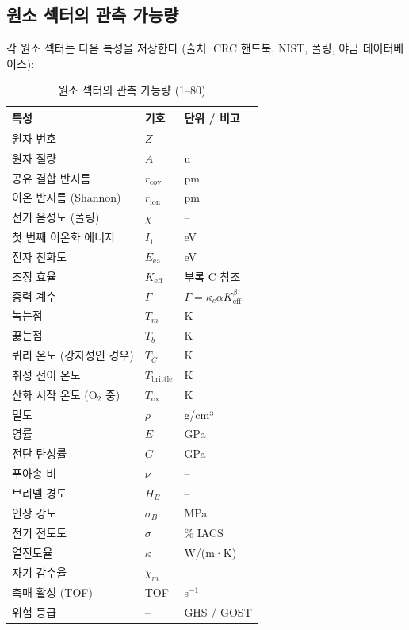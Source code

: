 \documentclass[12pt,a4paper]{article}
\newcommand{\Keff}{K_{\mathrm{eff}}}
\newcommand{\Gcoeff}{\Gamma}      %
\begin{document}
	\subsection{원소 섹터의 관측 가능량}
	
	각 원소 섹터는 다음 특성을 저장한다 (출처: CRC 핸드북, NIST, 폴링, 야금 데이터베이스):
	
	\begin{longtable}{p{4cm} p{3cm} p{8cm}}
		\caption{원소 섹터의 관측 가능량 (1–80)} \\
		\toprule
		\textbf{특성} & \textbf{기호} & \textbf{단위 / 비고} \\
		\midrule
		원자 번호 & \(Z\) & – \\
		원자 질량 & \(A\) & u \\
		공유 결합 반지름 & \(r_{\text{cov}}\) & pm \\
		이온 반지름 (Shannon) & \(r_{\text{ion}}\) & pm \\
		전기 음성도 (폴링) & \(\chi\) & – \\
		첫 번째 이온화 에너지 & \(I_1\) & eV \\
		전자 친화도 & \(E_{\text{ea}}\) & eV \\
		조정 효율 & \(\Keff\) & 부록 C 참조 \\
		중력 계수 & \(\Gcoeff\) & \(\Gcoeff = \kappa_c \alpha \Keff^{\beta}\) \\
		녹는점 & \(T_m\) & K \\
		끓는점 & \(T_b\) & K \\
		퀴리 온도 (강자성인 경우) & \(T_C\) & K \\
		취성 전이 온도 & \(T_{\text{brittle}}\) & K \\
		산화 시작 온도 (O\(_{2}\) 중) & \(T_{\text{ox}}\) & K \\
		밀도 & \(\rho\) & g/cm³ \\
		영률 & \(E\) & GPa \\
		전단 탄성률 & \(G\) & GPa \\
		푸아송 비 & \(\nu\) & – \\
		브리넬 경도 & \(H_B\) & – \\
		인장 강도 & \(\sigma_B\) & MPa \\
		전기 전도도 & \(\sigma\) & \% IACS \\
		열전도율 & \(\kappa\) & W/(m·K) \\
		자기 감수율 & \(\chi_m\) & – \\
		촉매 활성 (TOF) & TOF & s\(^{-1}\) \\
		위험 등급 & – & GHS / GOST \\
		\bottomrule
	\end{longtable}
	
\end{document}
